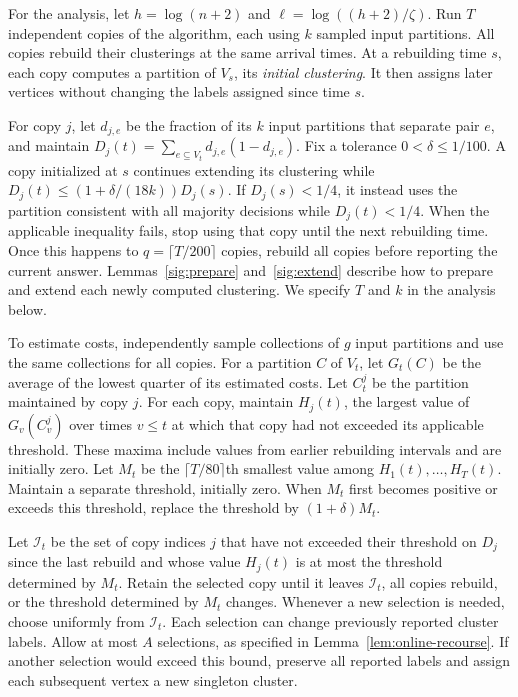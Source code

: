 \documentclass[11pt]{article}
\begin{document}
For the analysis, let $h=\log(n+2)$ and
$\ell=\log((h+2)/\zeta)$. Run $T$ independent copies of the algorithm,
each using $k$ sampled input partitions. All copies rebuild their
clusterings at the same arrival times. At a rebuilding time $s$, each
copy computes a partition of $V_s$, its \emph{initial clustering}. It
then assigns later vertices without changing the labels assigned since
time $s$.

For copy $j$, let $d_{j,e}$ be the fraction of its $k$ input partitions
that separate pair $e$, and maintain
$D_j(t)=\sum_{e\subseteq V_t}d_{j,e}(1-d_{j,e})$. Fix a tolerance
$0<\delta\le1/100$. A copy initialized at $s$ continues extending its
clustering while $D_j(t)\le(1+\delta/(18k))D_j(s)$. If $D_j(s)<1/4$,
it instead uses the partition consistent with all majority decisions
while $D_j(t)<1/4$. When the applicable inequality fails, stop using
that copy until the next rebuilding time. Once this happens to
$q=\lceil T/200\rceil$ copies, rebuild all copies before reporting the
current answer. Lemmas~\ref{sig:prepare} and~\ref{sig:extend} describe
how to prepare and extend each newly computed clustering. We specify
$T$ and $k$ in the analysis below.

To estimate costs, independently sample collections of $g$ input
partitions and use the same collections for all copies. For a partition
$C$ of $V_t$, let $G_t(C)$ be the average of the lowest quarter of its
estimated costs. Let $C_t^j$ be the partition maintained by copy $j$.
For each copy, maintain $H_j(t)$, the largest value of $G_v(C_v^j)$
over times $v\le t$ at which that copy had not exceeded its applicable
threshold. These maxima include values from earlier rebuilding
intervals and are initially zero. Let $M_t$ be the
$\lceil T/80\rceil$th smallest value among $H_1(t),\ldots,H_T(t)$.
Maintain a separate threshold, initially zero. When $M_t$ first becomes
positive or exceeds this threshold, replace the threshold by
$(1+\delta)M_t$.

Let $\mathcal I_t$ be the set of copy indices $j$ that have not exceeded
their threshold on $D_j$ since the last rebuild and whose value $H_j(t)$
is at most the threshold determined by $M_t$. Retain the selected copy
until it leaves $\mathcal I_t$, all copies rebuild, or the threshold
determined by $M_t$ changes. Whenever a new selection is needed, choose
uniformly from $\mathcal I_t$. Each selection can change previously
reported cluster labels. Allow at most $A$ selections, as specified in
Lemma~\ref{lem:online-recourse}. If another selection would exceed this
bound, preserve all reported labels and assign each subsequent vertex
a new singleton cluster.
\end{document}

